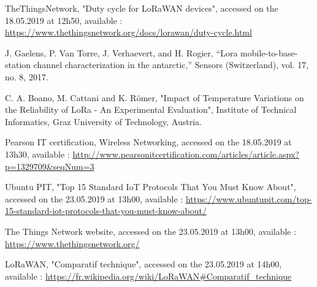 \documentclass[letterpaper, 10 pt, conference]{ieeeconf}  %
\begin{document}
\begin{thebibliography}{99}
 TheThingsNetwork, "Duty cycle for LoRaWAN devices", accessed on the 18.05.2019 at 12h50, available : \url{https://www.thethingsnetwork.org/docs/lorawan/duty-cycle.html}

 J. Gaelens, P. Van Torre, J. Verhaevert, and H. Rogier, “Lora mobile-to-base-station channel characterization in the antarctic,” Sensors (Switzerland), vol. 17, no. 8, 2017.

 C. A. Boano, M. Cattani and K. R\"omer, "Impact of Temperature Variations on the Reliability of LoRa - An Experimental Evaluation", Institute of Technical Informatics, Graz University of Technology, Austria.

 Pearson IT certification, Wireless Networking, accessed on the 18.05.2019 at 13h30, available : \url{http://www.pearsonitcertification.com/articles/article.aspx?p=1329709&seqNum=3}

 Ubuntu PIT, "Top 15 Standard IoT Protocols That You Must Know About", accessed on the 23.05.2019 at 13h00, available : \url{https://www.ubuntupit.com/top-15-standard-iot-protocols-that-you-must-know-about/}

 The Things Network website, accessed on the 23.05.2019 at 13h00, available : \url{https://www.thethingsnetwork.org/}

 LoRaWAN, "Comparatif technique", accessed on the 23.05.2019 at 14h00, available :  \url{https://fr.wikipedia.org/wiki/LoRaWAN#Comparatif_technique}


\end{thebibliography}
\end{document}
